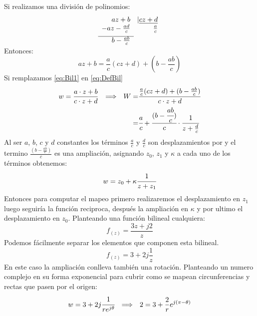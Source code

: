Si realizamos una división de polinomios:
\begin{equation}
    \begin{array}{*1r @{\hskip\arraycolsep}c@{\hskip\arraycolsep} *{11}r}
        az+b &  &|\underline{cz+d}  \\
        -az-\frac{ad}{c}&        & \frac{a}{c}\\[5pt]
        \cline{1-1}
        b-\frac{ab}{c}    &          &    \\[-5pt]
\end{array}
\end{equation}
Entonces:
\begin{equation}
    az+b=\frac{a}{c}(cz+d)+(b-\frac{ab}{c})
    \label{eq:Bil1}
\end{equation}
Si remplazamos \ref{eq:Bil1} en \ref{eq:DefBil}
\begin{equation}
\begin{aligned}
    w=\frac{a\cdot z+b}{c\cdot z+d}\hspace{0.25cm} \Longrightarrow \hspace{0.25cm} W=&\cfrac{\frac{a}{c}(cz+d)+(b-\frac{ab}{c})}{c\cdot z+d}\\
                                          =&\cfrac{a}{c}+\cfrac{(b-\cfrac{ab}{c})}{c}\cdot\cfrac{1}{z+\frac{d}{c}}                          
\end{aligned}
\end{equation}
Al ser $a$, $b$, $c$ y $d$ constantes los términos $\frac{a}{c}$ y $\frac{d}{c}$ son desplazamientos por y el termino $\frac{(b-\frac{ab}{c})}{c}$ es una ampliación, asignando $z_0$, $z_1$ y $\kappa$ a cada uno de los términos obtenemos:
\begin{equation}
    w=z_0+\kappa\cfrac{1}{z+z_1}
\end{equation}
Entonces para computar el mapeo primero realizaremos el desplazamiento en $z_1$ luego seguiría la función reciproca, después la ampliación en $\kappa$ y por ultimo el desplazamiento en $z_0$.
Planteando una función bilineal cualquiera:
\begin{equation}
    f_{(z)}=\frac{3z+j2}{z}
\end{equation}
Podemos fácilmente separar los elementos que componen esta bilineal.
\begin{equation}
    f_{(z)}=3+2j\frac{1}{z}
\end{equation}
En este caso la ampliación conlleva también una rotación. Planteando un numero complejo en su forma exponencial para cubrir como se mapean circunferencias y rectas que pasen por el origen:
\begin{equation}
    w=3+2j\cfrac{1}{re^{j\theta}}\hspace{0.25cm} \Longrightarrow \hspace{0.25cm} 2=3+\frac{2}{r}e^{j(\pi-\theta)}
\end{equation}

